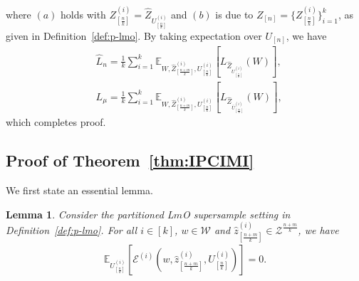 \documentclass[onecolumn,romanappendices,10pt]{IEEEtran}
\newtheorem{lemma}{Lemma}
\newcommand{\Ecal}{{\mathcal E}}
\newcommand{\Wcal}{{\mathcal W}}
\newcommand{\Zcal}{{\mathcal Z}}
\newcommand{\EE}{{\mathbb{E}}}
\begin{document}
	where $(a)$ holds with $Z^{(i)}_{[\frac{n}{k}]} = \hat{Z}_{U^{(i)}_{[\frac{n}{k}]}}$ and $(b)$ is due to $Z_{[n]} = \{Z^{(i)}_{[\frac{n}{k}]}\}_{i=1}^k$, as given in Definition~\ref{def:p-lmo}. By taking expectation over $U_{[n]}$, we have
	\begin{align}
		&\widehat{L}_n = \frac{1}{k} \sum_{i=1}^{k} \EE_{W, \hat{Z}^{(i)}_{[\frac{n+m}{k}]}, U^{(i)}_{[\frac{n}{k}]}} \left[ L_{\hat{Z}_{U^{(i)}_{[\frac{n}{k}]}}}(W) \right], \label{eq:emp_risk_lmo}\\
		&L_\mu = \frac{1}{k} \sum_{i=1}^{k} \EE_{W, \hat{Z}^{(i)}_{[\frac{n+m}{k}]}, U^{(i)}_{[\frac{n}{k}]}} \left[ L_{\hat{Z}_{\bar{U}^{(i)}_{[\frac{m}{k}]}}}(W) \right], \label{eq:pop_risk_lmo}
	\end{align}
	which completes proof.
	
	\subsection{Proof of Theorem~\ref{thm:IPCIMI}}\label{appsub:theorem6}
	We first state an essential lemma.
	\begin{lemma} \label{lem:symmetry} 
		Consider the partitioned L$m$O supersample setting in Definition~\ref{def:p-lmo}. For all $i \in [k]$, $w \in \Wcal$ and $\hat{z}^{(i)}_{[\frac{n+m}{k}]} \in \Zcal^{\frac{n+m}{k}}$, we have
		\begin{align}
			\EE_{U^{(i)}_{[\frac{n}{k}]}} \left[ \Ecal^{(i)} \left( w, \hat{z}^{(i)}_{[\frac{n+m}{k}]}, U^{(i)}_{[\frac{n}{k}]} \right) \right] = 0.
			\label{eq:symmetry}
		\end{align}
	\end{lemma}
	
\end{document}
